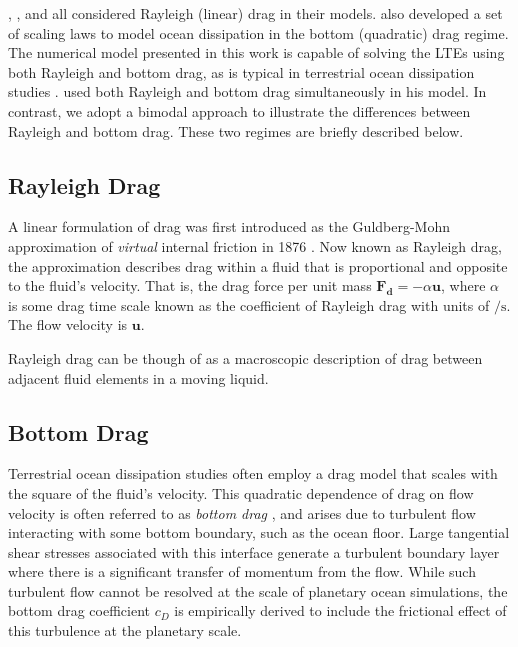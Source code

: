 \citet{tyler2011tidal}, \citet{matsuyama2014tidal}, and \citep{chen2013tidal} all considered Rayleigh (linear) drag in their models.  \citet{chen2013tidal} also developed a set of scaling laws to model ocean dissipation in the bottom (quadratic) drag regime. The numerical model presented in this work is capable of solving the LTEs using both Rayleigh and bottom drag, as is typical in terrestrial ocean dissipation studies \citep{taylor1920tidal,jeffreys1921tidal,zahel1977global,egbert2001estimates,jayne2001parameterizing}. \citet{sears1995tidal} used both Rayleigh and bottom drag simultaneously in his model. In contrast, we adopt a bimodal approach to illustrate the differences between Rayleigh and bottom drag. These two regimes are briefly described below.

\subsection{Rayleigh Drag}

A linear formulation of drag was first introduced as the Guldberg-Mohn approximation of \textit{virtual} internal friction in 1876 \citep{neumann1968ocean}. Now known as Rayleigh drag, the approximation describes drag within a fluid that is proportional and opposite to the fluid's velocity. That is, the drag force per unit mass $\bm{F_d} = -\alpha \bm{u}$, where $\alpha$ is some drag time scale known as the coefficient of Rayleigh drag with units of $\si{\per\second}$. The flow velocity is $\bm{u}$. 

Rayleigh drag can be though of as a macroscopic description of drag between adjacent fluid elements in a moving liquid.

\subsection{Bottom Drag}

Terrestrial ocean dissipation studies often employ a drag model that scales with the square of the fluid's velocity. This quadratic dependence of drag on flow velocity is often referred to as \textit{bottom drag} \citep{gill1982atmosphere}, and arises due to turbulent flow interacting with some bottom boundary, such as the ocean floor. Large tangential shear stresses associated with this interface generate a turbulent boundary layer where there is a significant transfer of momentum from the flow. While such turbulent flow cannot be resolved at the scale of planetary ocean simulations, the bottom drag coefficient $c_D$ is empirically derived to include the frictional effect of this turbulence at the planetary scale.

